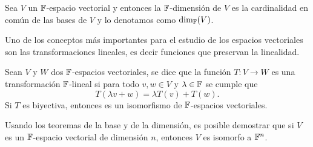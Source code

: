 \begin{defi}
  Sea $V$ un $\mathbb{F}$-espacio vectorial y entonces la $\mathbb{F}$-dimensión de $V$ es la cardinalidad en común de las bases de $V$ y lo denotamos como $\dim_{\mathbb{F}}(V)$.
\end{defi}

Uno de los conceptos más importantes para el estudio de los espacios vectoriales son las transformaciones lineales, es decir funciones que preservan la linealidad.

\begin{defi}
  Sean $V$ y $W$ dos $\mathbb{F}$-espacios vectoriales, se dice que la función $T\colon V\to W$ es una transformación $\mathbb{F}$-lineal si para todo $v,w \in V$ y $\lambda \in \mathbb{F}$ se cumple que 
  \[ T(\lambda v + w) = \lambda T(v) + T(w).\]
  Si $T$ es biyectiva, entonces es un isomorfismo de $\mathbb{F}$-espacios vectoriales.
\end{defi}

Usando los teoremas de la base y de la dimensión, es posible demostrar que si $V$ es un $\mathbb{F}$-espacio vectorial de dimensión $n$, entonces $V$ es isomorfo a $\mathbb{F}^n$.